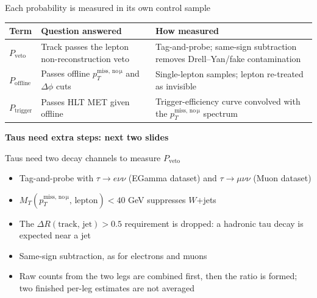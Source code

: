 \documentclass[aspectratio=169,12pt]{beamer}
\newcommand{\takeaway}[1]{\par\vspace{10pt}\centering\small\textbf{#1}\par}
\newcommand{\ptmiss}{\ensuremath{p_T^{\mathrm{miss,\,no\,\mu}}}}
\begin{document}
\begin{frame}{Each probability is measured in its own control sample}
  \small
  \begin{tabular}{p{}p{}p{}}
    \toprule
    Term & Question answered & How measured \\
    \midrule
    $P_{\mathrm{veto}}$ & Track passes the lepton non-reconstruction veto & Tag-and-probe; same-sign subtraction removes Drell--Yan/fake contamination \\
    $P_{\mathrm{offline}}$ & Passes offline \ptmiss{} and $\Delta\phi$ cuts & Single-lepton samples; lepton re-treated as invisible \\
    $P_{\mathrm{trigger}}$ & Passes HLT MET given offline & Trigger-efficiency curve convolved with the \ptmiss{} spectrum \\
    \bottomrule
  \end{tabular}
  \normalsize
  \takeaway{Taus need extra steps: next two slides}
\end{frame}

\begin{frame}{Taus need two decay channels to measure $P_{\mathrm{veto}}$}
  \begin{itemize}
    \item Tag-and-probe with $\tau\to e\nu\nu$ (EGamma dataset) and
          $\tau\to\mu\nu\nu$ (Muon dataset)
    \item $M_T(\ptmiss{},\,\text{lepton}) < 40$ GeV suppresses $W$+jets
    \item The $\Delta R(\text{track, jet}) > 0.5$ requirement is dropped: a
          hadronic tau decay is expected near a jet
    \item Same-sign subtraction, as for electrons and muons
    \item Raw counts from the two legs are combined first, then the ratio
          is formed; two finished per-leg estimates are not averaged
  \end{itemize}
\end{frame}
\end{document}
